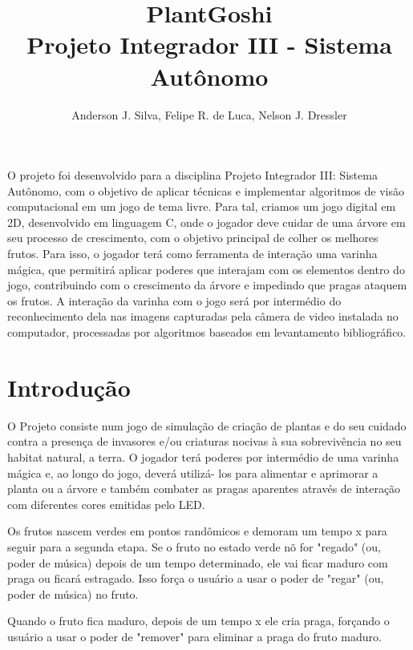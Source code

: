 \documentclass[12pt]{article}
\title{PlantGoshi\\ Projeto Integrador III - Sistema Aut\^onomo}
\author{Anderson J. Silva, Felipe R. de Luca, Nelson J. Dressler }
\begin{document}
 

\maketitle
     
\begin{resumo} 
O projeto foi desenvolvido para a disciplina Projeto Integrador III: Sistema Aut\^onomo,
com o objetivo de aplicar t\'ecnicas e implementar algoritmos de vis\~ao computacional
em um jogo de tema livre. Para tal, criamos um jogo digital em 2D, desenvolvido em linguagem C,
onde o jogador deve cuidar de uma \'arvore em seu processo de crescimento, com o objetivo
principal de colher os melhores frutos. Para isso, o jogador ter\'a como ferramenta de
intera\c c\~ao uma varinha m\'agica, que permitir\'a aplicar poderes que interajam
com os elementos dentro do jogo, contribuindo com o crescimento da \'arvore e impedindo
que pragas ataquem os frutos. A intera\c c\~ao da varinha com o jogo ser\'a por
interm\'edio do reconhecimento dela nas imagens capturadas pela c\^amera de video
instalada no computador, processadas por algoritmos baseados em levantamento bibliogr\'afico.

\end{resumo}

\section{Introdu\c c\~ao}

 O Projeto consiste num jogo de simula\c c\~ao de cria\c c\~ao
 de plantas e do seu cuidado contra a presen\c ca de invasores e/ou criaturas nocivas \`a sua
 sobreviv\^encia no seu habitat natural, a terra.
 O jogador ter\'a poderes por interm\'edio de uma varinha m\'agica e, ao longo do jogo, dever\'a utiliz\'a- los para alimentar e
 aprimorar a planta ou a \'arvore e tamb\'em combater as pragas aparentes atrav\'es
 de intera\c c\~ao com diferentes cores emitidas pelo LED.
 

 Os frutos nascem verdes em pontos rand\^omicos e demoram um tempo x para seguir para a segunda etapa.
 Se o fruto no estado verde n\~o for "regado" (ou, poder de música) depois de um tempo determinado,
 ele vai ficar maduro com praga ou ficar\'a estragado. Isso for\c ca o usu\'ario a usar o poder de "regar"
 (ou, poder de m\'usica) no fruto.
 
 Quando o fruto fica maduro, depois de um tempo x ele cria praga, for\c cando o usu\'ario a usar o poder
 de "remover" para eliminar a praga do fruto maduro. 
 
\end{document}
